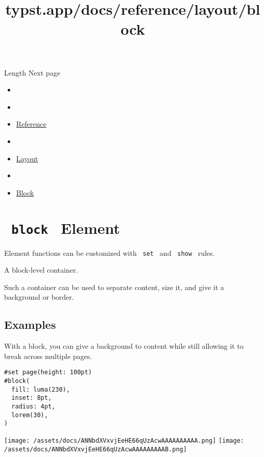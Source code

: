 { Length } { Next page }


\title{typst.app/docs/reference/layout/block}

\begin{itemize}
\tightlist
\item
  \href{/docs}{}
\item
  
\item
  \href{/docs/reference/}{Reference}
\item
  
\item
  \href{/docs/reference/layout/}{Layout}
\item
  
\item
  \href{/docs/reference/layout/block/}{Block}
\end{itemize}

\section{\texorpdfstring{\texttt{\ block\ } {{ Element
}}}{ block   Element }}\label{summary}

\label{element-tooltip}
Element functions can be customized with \texttt{\ set\ } and
\texttt{\ show\ } rules.

A block-level container.

Such a container can be used to separate content, size it, and give it a
background or border.

\subsection{Examples}\label{examples}

With a block, you can give a background to content while still allowing
it to break across multiple pages.

\begin{verbatim}
#set page(height: 100pt)
#block(
  fill: luma(230),
  inset: 8pt,
  radius: 4pt,
  lorem(30),
)
\end{verbatim}

\texttt{[image: /assets/docs/ANNbdXVxvjEeHE66qUzAcwAAAAAAAAAA.png]}
\texttt{[image: /assets/docs/ANNbdXVxvjEeHE66qUzAcwAAAAAAAAAB.png]}

